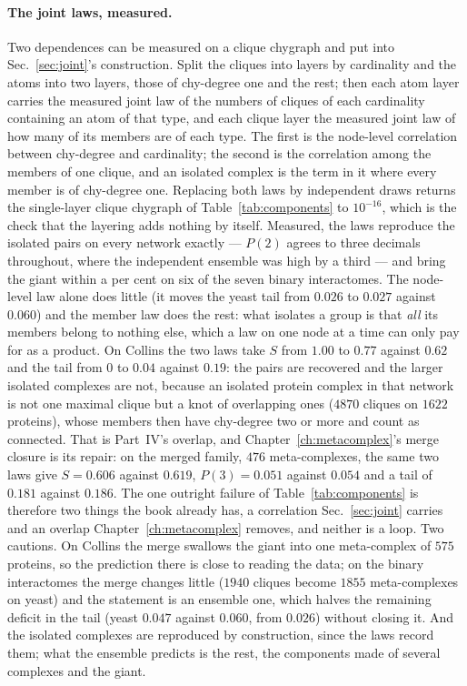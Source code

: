 \paragraph{The joint laws, measured.} Two dependences can be measured on a
clique chygraph and put into Sec.~\ref{sec:joint}'s construction. Split the
cliques into layers by cardinality and the atoms into two layers, those of
chy-degree one and the rest; then each atom layer carries the measured
joint law of the numbers of cliques of each cardinality containing an atom
of that type, and each clique layer the measured joint law of how many of
its members are of each type. The first is the node-level correlation
between chy-degree and cardinality; the second is the correlation among the
members of one clique, and an isolated complex is the term in it where
every member is of chy-degree one. Replacing both laws by independent draws
returns the single-layer clique chygraph of Table~\ref{tab:components} to
$10^{-16}$, which is the check that the layering adds nothing by itself.
Measured, the laws reproduce the isolated pairs on every network exactly
--- $P(2)$ agrees to three decimals throughout, where the independent
ensemble was high by a third --- and bring the giant within a per cent on
six of the seven binary interactomes. The node-level law alone does little
(it moves the yeast tail from $0.026$ to $0.027$ against $0.060$) and the
member law does the rest: what isolates a group is that \emph{all} its
members belong to nothing else, which a law on one node at a time can only
pay for as a product. On Collins the two laws take $S$ from $1.00$ to
$0.77$ against $0.62$ and the tail from $0$ to $0.04$ against $0.19$: the
pairs are recovered and the larger isolated complexes are not, because an
isolated protein complex in that network is not one maximal clique but a
knot of overlapping ones ($4870$ cliques on $1622$ proteins), whose
members then have chy-degree two or more and count as connected. That is
Part~IV's overlap, and Chapter~\ref{ch:metacomplex}'s merge closure is its
repair: on the merged family, $476$ meta-complexes, the same two laws give
$S=0.606$ against $0.619$, $P(3)=0.051$ against $0.054$ and a tail of
$0.181$ against $0.186$. The one outright failure of
Table~\ref{tab:components} is therefore two things the book already has,
a correlation Sec.~\ref{sec:joint} carries and an overlap
Chapter~\ref{ch:metacomplex} removes, and neither is a loop. Two cautions.
On Collins the merge swallows the giant into one meta-complex of $575$
proteins, so the prediction there is close to reading the data; on the
binary interactomes the merge changes little ($1940$ cliques become
$1855$ meta-complexes on yeast) and the statement is an ensemble one,
which halves the remaining deficit in the tail (yeast $0.047$ against
$0.060$, from $0.026$) without closing it. And the isolated complexes are
reproduced by construction, since the laws record them; what the ensemble
predicts is the rest, the components made of several complexes and the
giant.


